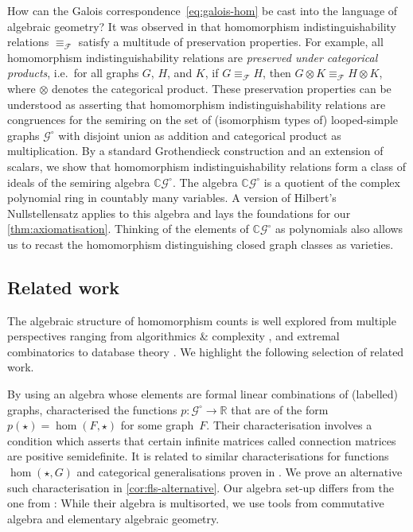 \documentclass[11pt]{scrartcl}
\theoremstyle{definition}
\theoremstyle{plain}
\theoremstyle{remark}
\newcommand{\lG}{\mathcal{G}^\circ}
\begin{document}
	How can the Galois correspondence~\eqref{eq:galois-hom} be cast into the language of algebraic geometry?
	It was observed in \cite{seppelt_logical_2024} that homomorphism indistinguishability relations $\equiv_{\mathcal{F}}$ satisfy a multitude of preservation properties.
	For example, all homomorphism indistinguishability relations are \emph{preserved under categorical products}, i.e.\ for all graphs $G$, $H$, and $K$, if $G \equiv_{\mathcal{F}} H$, then $G \otimes K \equiv_{\mathcal{F}} H \otimes K$, where $\otimes$ denotes the categorical product.
	These preservation properties can be understood as asserting that homomorphism indistinguishability relations are congruences for the semiring on the set of (isomorphism types of) looped-simple graphs $\lG$ with disjoint union as addition and categorical product as multiplication.
	By a standard Grothendieck construction and an extension of scalars,
	we show that homomorphism indistinguishability relations form a class of ideals of the semiring algebra $\mathbb{C}\lG$.
	The algebra $\mathbb{C}\lG$ is a quotient of the complex polynomial ring in countably many variables.
	A version of Hilbert's Nullstellensatz applies to this algebra and lays the foundations for our \cref{thm:axiomatisation}.
	Thinking of the elements of $\mathbb{C}\lG$ as polynomials also allows us to recast the homomorphism distinguishing closed graph classes  as varieties.



	\subsection*{Related work}

	The algebraic structure of homomorphism counts is well explored from multiple perspectives ranging from algorithmics \& complexity \cite{curticapean_homomorphisms_2017,chen_counting_2016,roth_parameterised_2026}, and extremal combinatorics \cite{lovasz_large_2012} to database theory \cite{kwiecien_determinacy_2022}.
	We highlight the following selection of related work.

	By using an algebra whose elements are formal linear combinations of (labelled) graphs,
	\textcite{lovasz_dual_2010} characterised the functions $p \colon \lG \to \mathbb{R}$ that are of the form $p(\star) = \hom(F, \star)$
	for some graph~$F$.
	Their characterisation involves a condition which asserts that certain infinite matrices called connection matrices are positive semidefinite. 
	It is related to similar characterisations for functions $\hom(\star, G)$ and categorical generalisations proven in \cite{freedman_reflection_2007,lovasz_semidefinite_2009,lovasz_large_2012}.
	We prove an alternative such characterisation in \cref{cor:fls-alternative}.
	Our algebra set-up differs from the one from \cite{lovasz_dual_2010}:
	While their algebra is multisorted, we use tools from commutative algebra and elementary algebraic geometry. 
\end{document}
